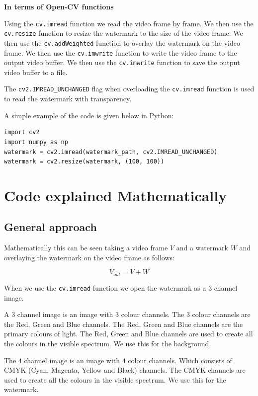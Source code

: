 \documentclass[ebook,12pt,oneside,openany]{memoir}
\begin{document}
\textbf{In terms of Open-CV functions}

Using the \verb|cv.imread| function we read the video frame by frame. We then use the \verb|cv.resize| function to resize the watermark to the size of the video frame. We then use the \verb|cv.addWeighted| function to overlay the watermark on the video frame. We then use the \verb|cv.imwrite| function to write the video frame to the output video buffer. We then use the \verb|cv.imwrite| function to save the output video buffer to a file.

The \verb|cv2.IMREAD_UNCHANGED| flag when overloading the \verb|cv.imread| function is used to read the watermark with transparency.

\newpage

A simple example of the code is given below in Python:

\begin{lstlisting}[frame=single,breaklines,globe=5]
import cv2
import numpy as np
watermark = cv2.imread(watermark_path, cv2.IMREAD_UNCHANGED)
watermark = cv2.resize(watermark, (100, 100))    
\end{lstlisting}

\section{Code explained Mathematically}

\subsection{General approach}

Mathematically this can be seen taking a video frame $V$ and a watermark $W$ and overlaying the watermark on the video frame as follows:

\begin{equation}
V_{out} = V + W
\end{equation}

When we use the \verb|cv.imread| function we open the watermark as a $3$ channel image. 

A $3$ channel image is an image with $3$ colour channels. The $3$ colour channels are the Red, Green and Blue channels. The Red, Green and Blue channels are the primary colours of light. The Red, Green and Blue channels are used to create all the colours in the visible spectrum. We use this for the 
background.

The $4$ channel image is an image with $4$ colour channels. Which consists of 
CMYK (Cyan, Magenta, Yellow and Black) channels. The CMYK channels are used to create all the colours in the visible spectrum. We use this for the watermark.
\end{document}
